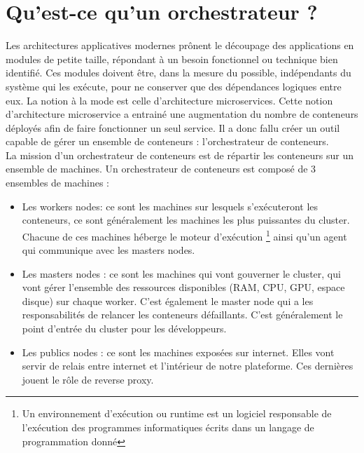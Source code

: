 \documentclass[11pt,fleqn]{book} %
\begin{document}
\section{Qu'est-ce qu'un orchestrateur ? }
Les architectures applicatives modernes prônent le découpage des applications en modules de petite taille, répondant à un besoin fonctionnel ou technique bien identifié. Ces modules doivent être, dans la mesure du possible, indépendants du système qui les exécute, pour ne conserver que des dépendances logiques entre eux. La notion à la mode est celle d’architecture microservices. Cette notion d'architecture microservice a entrainé une augmentation du nombre de conteneurs déployés afin de faire fonctionner un seul service. Il a donc fallu créer un outil capable de gérer un ensemble de conteneurs : l'orchestrateur de conteneurs.\\ 

La mission d'un orchestrateur de conteneurs est de répartir les conteneurs sur un ensemble de machines. Un orchestrateur de conteneurs est composé de 3 ensembles de machines :
\begin{itemize}
    \item Les workers nodes: ce sont les machines sur lesquels s'exécuteront les conteneurs, ce sont généralement les machines les plus puissantes du cluster. Chacune de ces machines héberge le moteur d'exécution \footnote{Un environnement d'exécution ou runtime est un logiciel responsable de l'exécution des programmes informatiques écrits dans un langage de programmation donné} ainsi qu'un agent qui communique avec les masters nodes.
    \item Les masters nodes : ce sont les machines qui vont gouverner le cluster, qui vont gérer l'ensemble des ressources disponibles (RAM, CPU, GPU, espace disque) sur chaque worker. C'est également le master node qui a les responsabilités de relancer les conteneurs défaillants. C'est généralement le point d'entrée du cluster pour les développeurs.
    \item Les publics nodes :  ce sont les machines exposées sur internet. Elles vont servir de relais entre internet et l'intérieur de notre plateforme. Ces dernières jouent le rôle de reverse proxy.\\
\end{itemize}
 
\end{document}
